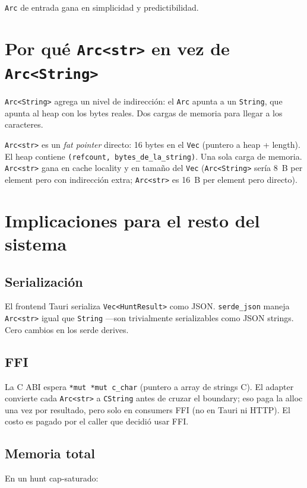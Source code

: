 \noindent
\texttt{Arc} de entrada gana en simplicidad y predictibilidad.

\section{Por qué \texttt{Arc<str>} en vez de \texttt{Arc<String>}}

\texttt{Arc<String>} agrega un nivel de indirección: el \texttt{Arc}
apunta a un \texttt{String}, que apunta al heap con los bytes
reales. Dos cargas de memoria para llegar a los caracteres.

\texttt{Arc<str>} es un \emph{fat pointer} directo: 16 bytes en el
\texttt{Vec} (puntero a heap + length). El heap contiene
\texttt{(refcount, bytes\_de\_la\_string)}. Una sola carga de
memoria. \texttt{Arc<str>} gana en cache locality y en tamaño del
\texttt{Vec} (\texttt{Arc<String>} sería 8~B per element pero con
indirección extra; \texttt{Arc<str>} es 16~B per element pero
directo).

\section{Implicaciones para el resto del sistema}

\subsection{Serialización}

El frontend Tauri serializa \texttt{Vec<HuntResult>} como JSON.
\texttt{serde\_json} maneja \texttt{Arc<str>} igual que
\texttt{String} ---son trivialmente serializables como JSON
strings. Cero cambios en los serde derives.

\subsection{FFI}

La C ABI espera \texttt{*mut *mut c\_char} (puntero a array de
strings C). El adapter convierte cada \texttt{Arc<str>} a
\texttt{CString} antes de cruzar el boundary; eso paga la alloc
una vez por resultado, pero solo en consumers FFI (no en Tauri ni
HTTP). El costo es pagado por el caller que decidió usar FFI.

\subsection{Memoria total}

En un hunt cap-saturado:

